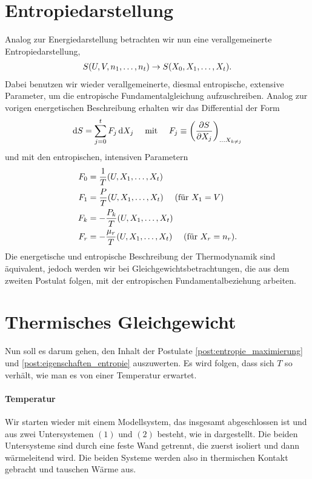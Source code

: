 \section{Entropiedarstellung}
Analog zur Energiedarstellung betrachten wir nun eine verallgemeinerte Entropiedarstellung,
\begin{align*}
    S(U,V,n_1,\ldots,n_t) \rightarrow S(X_0,X_1,\ldots,X_t).
\end{align*}
Dabei benutzen wir wieder verallgemeinerte, diesmal entropische, extensive Parameter, um die entropische Fundamentalgleichung aufzuschreiben. Analog zur vorigen energetischen Beschreibung erhalten wir das Differential der Form
\begin{align*}
    \mathop{}\!\mathrm{d} S = \sum_{j=0}^tF_j\mathop{}\!\mathrm{d} X_j \quad\text{ mit } \quad F_j\equiv\left( \frac{\partial S}{\partial X_j} \right)_{\ldots X_{k\neq j}}
\end{align*}
und mit den entropischen, intensiven Parametern
\begin{align*}
    F_0 & =\frac{1}{T}(U,X_1,\ldots,X_t)                                      \\
    F_1 & =\frac{P}{T}(U,X_1,\ldots,X_t) \quad\text{ (für $X_1=V$)}           \\
    F_k & =-\frac{P_k}{T}(U,X_1,\ldots,X_t)                                   \\
    F_r & =-\frac{\mu_r}{T}(U,X_1,\ldots,X_t) \quad\text{ (für $X_r=n_r$)}.
\end{align*}
Die energetische und entropische Beschreibung der Thermodynamik sind äquivalent, jedoch werden wir bei Gleichgewichtsbetrachtungen, die aus dem zweiten Postulat folgen, mit der entropischen Fundamentalbeziehung arbeiten.

\section{Thermisches Gleichgewicht\label{sec:thermisches_gleichgewicht}}

Nun soll es darum gehen, den Inhalt der Postulate \ref{post:entropie_maximierung} und \ref{post:eigenschaften_entropie} auszuwerten.
Es wird folgen, dass sich $T$ so verhält, wie man es von einer Temperatur erwartet.

\paragraph*{Temperatur}

Wir starten wieder mit einem Modellsystem, das insgesamt abgeschlossen ist und aus zwei Untersystemen $(1)$ und $(2)$ besteht, wie in  dargestellt.
Die beiden Untersysteme sind durch eine feste Wand getrennt, die zuerst isoliert und dann wärmeleitend wird. Die beiden Systeme werden also in thermischen Kontakt gebracht und tauschen Wärme aus.

